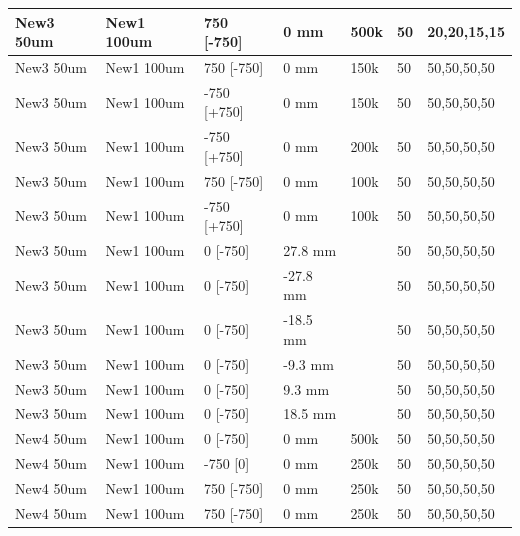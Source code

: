 \begin{refsection}
\begin{table}
\begin{tabular}{|l|l|l|l|l|l|l|}
            New3 50um   & New1 100um  & 750 {[}-750{]}   & 0 mm     & 500k   & 50            & 20,20,15,15       \\ \hline
            New3 50um   & New1 100um  & 750 {[}-750{]}   & 0 mm     & 150k   & 50            & 50,50,50,50       \\ \hline
            New3 50um   & New1 100um  & -750 {[}+750{]}  & 0 mm     & 150k   & 50            & 50,50,50,50       \\ \hline
            New3 50um   & New1 100um  & -750 {[}+750{]}  & 0 mm     & 200k   & 50            & 50,50,50,50       \\ \hline
            New3 50um   & New1 100um  & 750 {[}-750{]}   & 0 mm     & 100k   & 50            & 50,50,50,50       \\ \hline
            New3 50um   & New1 100um  & -750 {[}+750{]}  & 0 mm     & 100k   & 50            & 50,50,50,50       \\ \hline
            New3 50um   & New1 100um  & 0 {[}-750{]}     & 27.8 mm  &        & 50            & 50,50,50,50       \\ \hline
            New3 50um   & New1 100um  & 0 {[}-750{]}     & -27.8 mm &        & 50            & 50,50,50,50       \\ \hline
            New3 50um   & New1 100um  & 0 {[}-750{]}     & -18.5 mm &        & 50            & 50,50,50,50       \\ \hline
            New3 50um   & New1 100um  & 0 {[}-750{]}     & -9.3 mm  &        & 50            & 50,50,50,50       \\ \hline
            New3 50um   & New1 100um  & 0 {[}-750{]}     & 9.3 mm   &        & 50            & 50,50,50,50       \\ \hline
            New3 50um   & New1 100um  & 0 {[}-750{]}     & 18.5 mm  &        & 50            & 50,50,50,50       \\ \hline
            New4 50um   & New1 100um  & 0 {[}-750{]}     & 0 mm     & 500k   & 50            & 50,50,50,50       \\ \hline
            New4 50um   & New1 100um  & -750 {[}0{]}     & 0 mm     & 250k   & 50            & 50,50,50,50       \\ \hline
            New4 50um   & New1 100um  & 750 {[}-750{]}   & 0 mm     & 250k   & 50            & 50,50,50,50       \\ \hline
            New4 50um   & New1 100um  & 750 {[}-750{]}   & 0 mm     & 250k   & 50            & 50,50,50,50       \\ \hline

\end{tabular}
\end{table}
\end{refsection}
